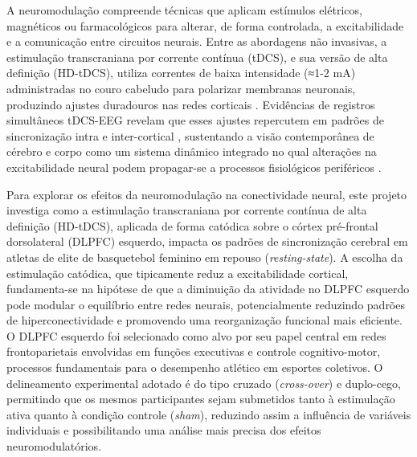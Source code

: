 A neuromodulação compreende técnicas que aplicam estímulos elétricos, magnéticos ou farmacológicos para alterar, de forma controlada, a excitabilidade e a comunicação entre circuitos neurais. Entre as abordagens não invasivas, a estimulação transcraniana por corrente contínua (tDCS), e sua versão de alta definição (HD-tDCS), utiliza correntes de baixa intensidade (≈1-2 mA) administradas no couro cabeludo para polarizar membranas neuronais, produzindo ajustes duradouros nas redes corticais \cite{nitsche2000excitability,stagg2011physiological}. Evidências de registros simultâneos tDCS-EEG revelam que esses ajustes repercutem em padrões de sincronização intra e inter-cortical \cite{kunze2014high}, sustentando a visão contemporânea de cérebro e corpo como um sistema dinâmico integrado no qual alterações na excitabilidade neural podem propagar-se a processos fisiológicos periféricos \cite{criscuolo2022cognition}.

Para explorar os efeitos da neuromodulação na conectividade neural, este projeto investiga como a estimulação transcraniana por corrente contínua de alta definição (HD-tDCS), aplicada de forma catódica sobre o córtex pré-frontal dorsolateral (DLPFC) esquerdo, impacta os padrões de sincronização cerebral em atletas de elite de basquetebol feminino em repouso (\textit{resting-state}). A escolha da estimulação catódica, que tipicamente reduz a excitabilidade cortical, fundamenta-se na hipótese de que a diminuição da atividade no DLPFC esquerdo pode modular o equilíbrio entre redes neurais, potencialmente reduzindo padrões de hiperconectividade e promovendo uma reorganização funcional mais eficiente. O DLPFC esquerdo foi selecionado como alvo por seu papel central em redes frontoparietais envolvidas em funções executivas e controle cognitivo-motor, processos fundamentais para o desempenho atlético em esportes coletivos. O delineamento experimental adotado é do tipo cruzado (\textit{cross-over}) e duplo-cego, permitindo que os mesmos participantes sejam submetidos tanto à estimulação ativa quanto à condição controle (\textit{sham}), reduzindo assim a influência de variáveis individuais e possibilitando uma análise mais precisa dos efeitos neuromodulatórios.


